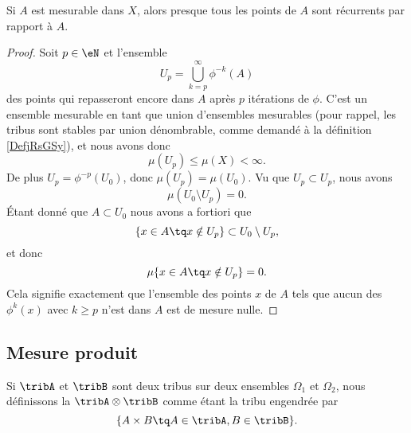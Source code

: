 \begin{theorem}     \label{ThoYnLNEL}
    Si \( A\) est mesurable dans \( X\), alors presque tous les points de \( A\) sont récurrents par rapport à \( A\).
\end{theorem}

\begin{proof}
    Soit \( p\in \eN\) et l'ensemble
    \begin{equation}
        U_p=\bigcup_{k=p}^{\infty}\phi^{-k}(A)
    \end{equation}
    des points qui repasseront encore dans \( A\) après \( p\) itérations  de \( \phi\). C'est un ensemble mesurable en tant que union d'ensembles mesurables (pour rappel, les tribus sont stables par union dénombrable, comme demandé à la définition \ref{DefjRsGSy}), et nous avons donc
    \begin{equation}
        \mu(U_p)\leq \mu(X)<\infty.
    \end{equation}
    De plus \( U_p=\phi^{-p}(U_0)\), donc \( \mu(U_p)=\mu(U_0)\). Vu que \( U_p\subset U_p\), nous avons
    \begin{equation}
        \mu(U_0\setminus U_p)=0.
    \end{equation}
    Étant donné que \( A\subset U_0\) nous avons a fortiori que
    \begin{equation}
        \{ x\in A\tq x\notin U_p \}\subset U_0\setminus U_p,
    \end{equation}
    et donc
    \begin{equation}
        \mu\{ x\in A\tq x\notin U_p \}=0.
    \end{equation}
    Cela signifie exactement que l'ensemble des points \( x\) de \( A\) tels que aucun des \( \phi^k(x)\) avec \( k\geq p\) n'est dans \( A\) est de mesure nulle.
\end{proof}

\subsection{Mesure produit}

\begin{definition}      \label{DefTribProfGfYTuR}
    Si \( \tribA\) et \( \tribB\) sont deux tribus sur deux ensembles \( \Omega_1\) et \( \Omega_2\), nous définissons la  \( \tribA\otimes\tribB\) comme étant la tribu engendrée par 
    \begin{equation}
        \{ A\times B\tq A\in\tribA,B\in\tribB \}.
    \end{equation}
\end{definition}

